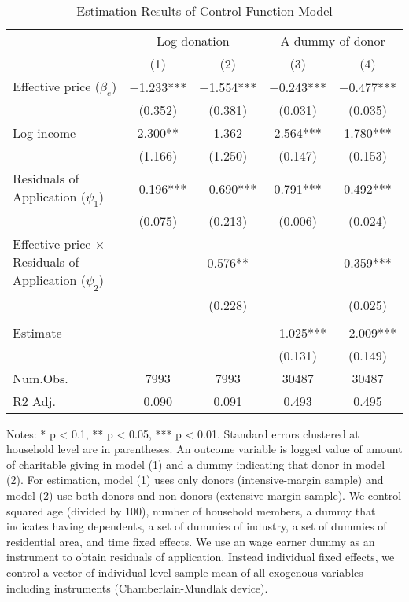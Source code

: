 \begin{table}

\caption{Estimation Results of Control Function Model\label{tab:cf}}
\centering
\fontsize{8}{10}\selectfont
\begin{threeparttable}
\begin{tabular}[t]{lcccc}
\toprule
\multicolumn{1}{c}{ } & \multicolumn{2}{c}{Log donation} & \multicolumn{2}{c}{A dummy of donor} \\
\cmidrule(l{3pt}r{3pt}){2-3} \cmidrule(l{3pt}r{3pt}){4-5}
  & (1) & (2) & (3) & (4)\\
\midrule
Effective price ($\beta_e$) & \num{-1.233}*** & \num{-1.554}*** & \num{-0.243}*** & \num{-0.477}***\\
 & (\num{0.352}) & (\num{0.381}) & (\num{0.031}) & (\num{0.035})\\
Log income & \num{2.300}** & \num{1.362} & \num{2.564}*** & \num{1.780}***\\
 & (\num{1.166}) & (\num{1.250}) & (\num{0.147}) & (\num{0.153})\\
Residuals of Application ($\psi_1$) & \num{-0.196}*** & \num{-0.690}*** & \num{0.791}*** & \num{0.492}***\\
 & (\num{0.075}) & (\num{0.213}) & (\num{0.006}) & (\num{0.024})\\
Effective price $\times$ Residuals of Application ($\psi_2$) &  & \num{0.576}** &  & \num{0.359}***\\
 &  & (\num{0.228}) &  & (\num{0.025})\\
\midrule
\addlinespace[0.3em]
\multicolumn{5}{l}{\textit{Implied price elasticity}}\\
\hspace{1em}Estimate &  &  & \num{-1.025}*** & \num{-2.009}***\\
\hspace{1em} &  &  & (\num{0.131}) & (\num{0.149})\\
Num.Obs. & \num{7993} & \num{7993} & \num{30487} & \num{30487}\\
R2 Adj. & \num{0.090} & \num{0.091} & \num{0.493} & \num{0.495}\\
\bottomrule
\end{tabular}
\begin{tablenotes}
\item Notes: * p < 0.1, ** p < 0.05, *** p < 0.01. Standard errors clustered at household level are in parentheses. An outcome variable is logged value of amount of charitable giving in model (1) and a dummy indicating that donor in model (2). For estimation, model (1) uses only donors (intensive-margin sample) and model (2) use both donors and non-donors (extensive-margin sample). We control squared age (divided by 100), number of household members, a dummy that indicates having dependents, a set of dummies of industry, a set of dummies of residential area, and time fixed effects. We use an wage earner dummy as an instrument to obtain residuals of application. Instead individual fixed effects, we control a vector of individual-level sample mean of all exogenous variables including instruments (Chamberlain-Mundlak device).
\end{tablenotes}
\end{threeparttable}
\end{table}
